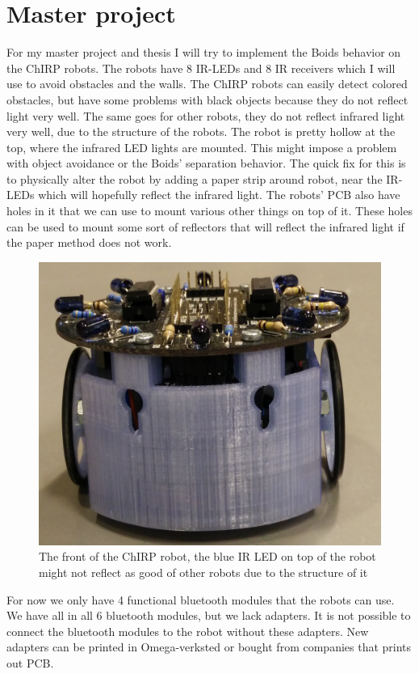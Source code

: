 \section{Master project}
\label{sec:master}
For my master project and thesis I will try to implement the Boids behavior on the ChIRP robots. The robots have 8 IR-LEDs and 8 IR receivers which I will use to avoid obstacles and the walls. The ChIRP robots can easily detect colored obstacles, but have some problems with black objects because they do not reflect light very well. The same goes for other robots, they do not reflect infrared light very well, due to the structure of the robots. The robot is pretty hollow at the top, where the infrared LED lights are mounted. This might impose a problem with object avoidance or the Boids' separation behavior. The quick fix for this is to physically alter the robot by adding a paper strip around robot, near the IR-LEDs which will hopefully reflect the infrared light.
The robots' PCB also have holes in it that we can use to mount various other things on top of it. These holes can be used to mount some sort of reflectors that will reflect the infrared light if the paper method does not work.
\begin{figure}[H]
\centering
\includegraphics[width=0.8\linewidth]{images/chirpFront.jpg}
\caption[Front of ChIRP robot]{The front of the ChIRP robot, the blue IR LED on top of the robot might not reflect as good of other robots due to the structure of it}
\label{fig:chirpsFront}
\end{figure}
For now we only have 4 functional bluetooth modules that the robots can use. We have all in all 6 bluetooth modules, but we lack adapters. It is not possible to connect the bluetooth modules to the robot without these adapters. New adapters can be printed in Omega-verksted or bought from companies that prints out PCB.

